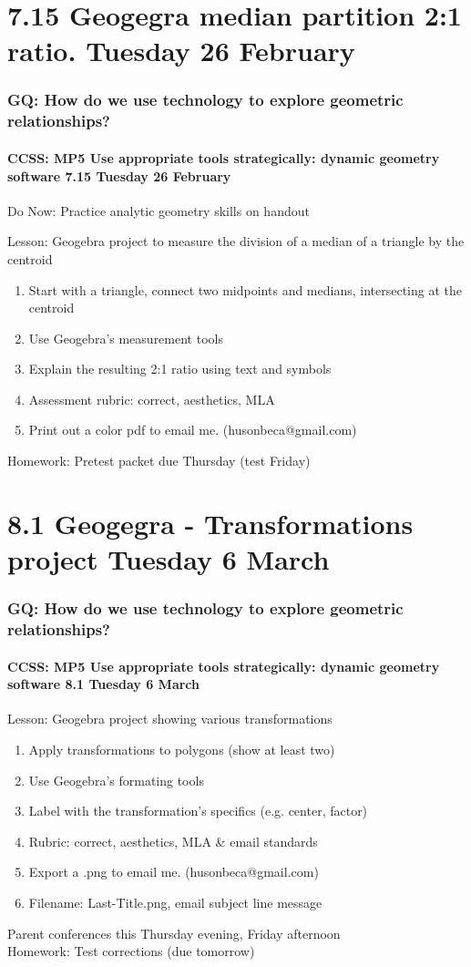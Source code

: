 \documentclass{beamer}
\begin{document}
\section{7.15 Geogegra median partition 2:1 ratio. Tuesday 26 February}
  \frame
  {
    \frametitle{GQ: How do we use technology to explore geometric relationships?}
    \framesubtitle{CCSS: MP5 Use appropriate tools strategically: dynamic geometry software \hfill \alert{7.15 Tuesday 26 February}}

    Do Now: Practice analytic geometry skills on handout
    \begin{block}{Lesson: Geogebra project to measure the division of a median of a triangle by the centroid}
      \begin{enumerate}
        \item Start with a triangle, connect two midpoints and medians, intersecting at the centroid
        \item Use Geogebra's measurement tools
        \item Explain the resulting 2:1 ratio using text and symbols
        \item Assessment rubric: correct, aesthetics, MLA
        \item Print out a color pdf to email me. (husonbeca@gmail.com)
      \end{enumerate}
    \end{block}
    Homework: Pretest packet due Thursday \alert{(test Friday)}
  }

\section{8.1 Geogegra - Transformations project Tuesday 6 March}
  \frame
  {
    \frametitle{GQ: How do we use technology to explore geometric relationships?}
    \framesubtitle{CCSS: MP5 Use appropriate tools strategically: dynamic geometry software \hfill \alert{8.1 Tuesday 6 March}}

    \begin{block}{Lesson: Geogebra project showing various transformations}
      \begin{enumerate}
        \item Apply transformations to polygons (show at least two)
        \item Use Geogebra's formating tools
        \item Label with the transformation's specifics (e.g. center, factor)
        \item Rubric: correct, aesthetics, \alert{MLA \& email standards}
        \item Export a .png to email me. (husonbeca@gmail.com)
        \item Filename: Last-Title.png, email subject line message
      \end{enumerate}
    \end{block}
    \alert{Parent conferences this Thursday evening, Friday afternoon}\\
    Homework: Test corrections  (due tomorrow)
  }
\end{document}
